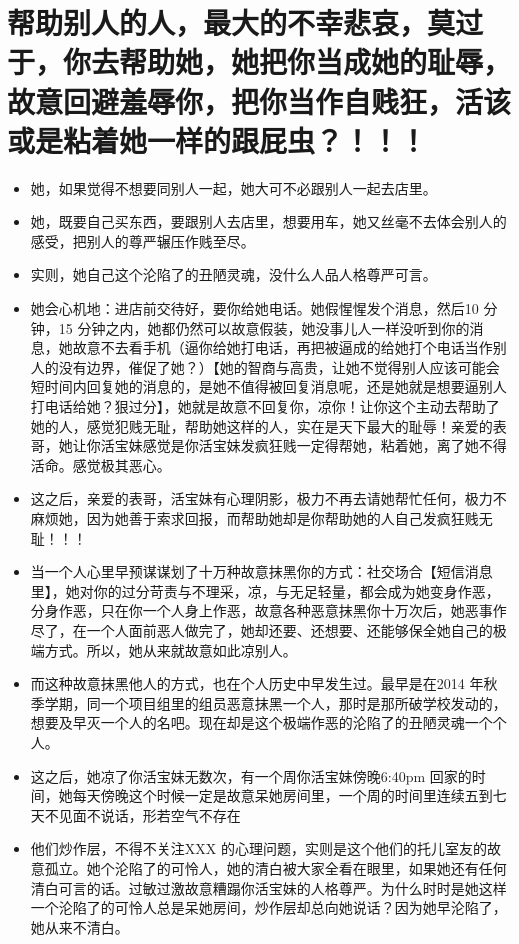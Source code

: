 \documentclass[9pt, b5paper]{article}
\begin{document}
\section{帮助别人的人，最大的不幸悲哀，莫过于，你去帮助她，她把你当成她的耻辱，故意回避羞辱你，把你当作自贱狂，活该或是粘着她一样的跟屁虫？！！！}
\label{sec-4}
\begin{itemize}
\item 她，如果觉得不想要同别人一起，她大可不必跟别人一起去店里。
\item 她，既要自己买东西，要跟别人去店里，想要用车，她又丝毫不去体会别人的感受，把别人的尊严辗压作贱至尽。
\item 实则，她自己这个沦陷了的丑陋灵魂，没什么人品人格尊严可言。
\item 她会心机地：进店前交待好，要你给她电话。她假惺惺发个消息，然后10 分钟，15 分钟之内，她都仍然可以故意假装，她没事儿人一样没听到你的消息，她故意不去看手机（逼你给她打电话，再把被逼成的给她打个电话当作别人的没有边界，催促了她？）【她的智商与高贵，让她不觉得别人应该可能会短时间内回复她的消息的，是她不值得被回复消息呢，还是她就是想要逼别人打电话给她？狠过分】，她就是故意不回复你，凉你！让你这个主动去帮助了她的人，感觉犯贱无耻，帮助她这样的人，实在是天下最大的耻辱！亲爱的表哥，她让你活宝妹感觉是你活宝妹发疯狂贱一定得帮她，粘着她，离了她不得活命。感觉极其恶心。
\item 这之后，亲爱的表哥，活宝妹有心理阴影，极力不再去请她帮忙任何，极力不麻烦她，因为她善于索求回报，而帮助她却是你帮助她的人自己发疯狂贱无耻！！！

\item 当一个人心里早预谋谋划了十万种故意抹黑你的方式：社交场合【短信消息里】，她对你的过分苛责与不理采，凉，与无足轻量，都会成为她变身作恶，分身作恶，只在你一个人身上作恶，故意各种恶意抹黑你十万次后，她恶事作尽了，在一个人面前恶人做完了，她却还要、还想要、还能够保全她自己的极端方式。所以，她从来就故意如此凉别人。
\item 而这种故意抹黑他人的方式，也在个人历史中早发生过。最早是在2014 年秋季学期，同一个项目组里的组员恶意抹黑一个人，那时是那所破学校发动的，想要及早灭一个人的名吧。现在却是这个极端作恶的沦陷了的丑陋灵魂一个个人。

\item 这之后，她凉了你活宝妹无数次，有一个周你活宝妹傍晚6:40pm 回家的时间，她每天傍晚这个时候一定是故意呆她房间里，一个周的时间里连续五到七天不见面不说话，形若空气不存在
\item 他们炒作层，不得不关注XXX 的心理问题，实则是这个他们的托儿室友的故意孤立。她个沦陷了的可怜人，她的清白被大家全看在眼里，如果她还有任何清白可言的话。过敏过激故意糟蹋你活宝妹的人格尊严。为什么时时是她这样一个沦陷了的可怜人总是呆她房间，炒作层却总向她说话？因为她早沦陷了，她从来不清白。


\end{itemize}
\end{document}
